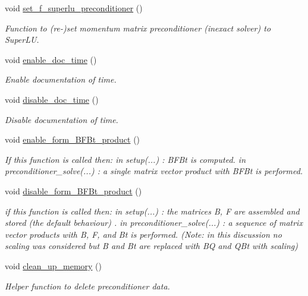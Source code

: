 \begin{DoxyCompactItemize}
void \hyperlink{classoomph_1_1PressureBasedSolidLSCPreconditioner_afd0606b3f743c14d4a0d96477906cd47}{set\+\_\+f\+\_\+superlu\+\_\+preconditioner} ()
\begin{DoxyCompactList}\small\item\em Function to (re-\/)set momentum matrix preconditioner (inexact solver) to Super\+LU. \end{DoxyCompactList}\item 
void \hyperlink{classoomph_1_1PressureBasedSolidLSCPreconditioner_a1bfac76fb2b7451f009d2cb2fea5d07d}{enable\+\_\+doc\+\_\+time} ()
\begin{DoxyCompactList}\small\item\em Enable documentation of time. \end{DoxyCompactList}\item 
void \hyperlink{classoomph_1_1PressureBasedSolidLSCPreconditioner_a6828b0336e94e6acaaef7623f6425792}{disable\+\_\+doc\+\_\+time} ()
\begin{DoxyCompactList}\small\item\em Disable documentation of time. \end{DoxyCompactList}\item 
void \hyperlink{classoomph_1_1PressureBasedSolidLSCPreconditioner_a302edf88e0ec3fa457022a9a3886cdf9}{enable\+\_\+form\+\_\+\+B\+F\+Bt\+\_\+product} ()
\begin{DoxyCompactList}\small\item\em If this function is called then\+: in setup(...) \+: B\+F\+Bt is computed. in preconditioner\+\_\+solve(...) \+: a single matrix vector product with B\+F\+Bt is performed. \end{DoxyCompactList}\item 
void \hyperlink{classoomph_1_1PressureBasedSolidLSCPreconditioner_aeb2296a7bc2ba3de7c332506a768c4c4}{disable\+\_\+form\+\_\+\+B\+F\+Bt\+\_\+product} ()
\begin{DoxyCompactList}\small\item\em if this function is called then\+: in setup(...) \+: the matrices B, F are assembled and stored (the default behaviour) . in preconditioner\+\_\+solve(...) \+: a sequence of matrix vector products with B, F, and Bt is performed. (Note\+: in this discussion no scaling was considered but B and Bt are replaced with BQ and Q\+Bt with scaling) \end{DoxyCompactList}\item 
void \hyperlink{classoomph_1_1PressureBasedSolidLSCPreconditioner_ad83eb2ddd12350bcba2cb8db074de2bd}{clean\+\_\+up\+\_\+memory} ()
\begin{DoxyCompactList}\small\item\em Helper function to delete preconditioner data. \end{DoxyCompactList}\end{DoxyCompactItemize}
